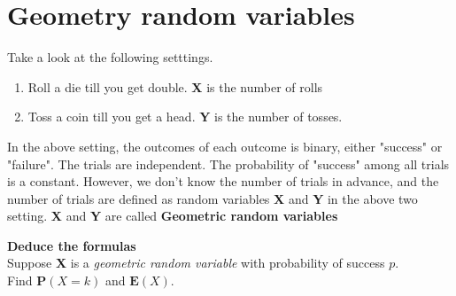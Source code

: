 \documentclass[a4paper, 12pt,twoside]{book}
\begin{document}
  \section{Geometry random variables}  
Take a look at the following setttings.
\begin{enumerate}[(1)]
    \item Roll a die till you get double. \textbf{X} is  the number of rolls
    \item Toss a coin till you get a head. \textbf{Y} is the number of tosses.
\end{enumerate}
In the above setting, the outcomes of each outcome is binary, either "success" or "failure". The trials are independent. The probability of "success" among all trials is a constant. However, we don't know the number of trials in advance, and the number of trials are defined as random variables \textbf{X} and \textbf{Y} in the above two setting. \textbf{X} and \textbf{Y} are called \textbf{Geometric random variables}\vspace{0.6cm}\\

\colorbox{champagne}{\parbox{\textwidth}{
\textbf{Deduce the formulas}\vspace{0.3cm}\\
Suppose \textbf{X} is a \textit{geometric random variable} with probability of success $p$.\vspace{0.3cm}\\
Find $\textbf{P}(X = k)$ and $\textbf{E}(X)$.
}}


     
\end{document}
